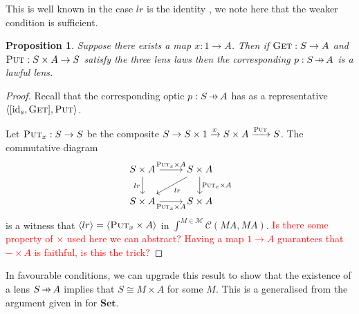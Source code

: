 \documentclass[11pt,a4paper]{article}
\theoremstyle{plain}
\newtheorem{proposition}[theorem]{Proposition}
\theoremstyle{definition}
\newcommand{\C}{\mathscr{C}}
\newcommand{\M}{\mathscr{M}}
\newcommand{\Set}{\mathbf{Set}}
\newcommand{\id}{\mathrm{id}}
\newcommand{\fget}{\textsc{Get}}
\newcommand{\fput}{\textsc{Put}}
\newcommand{\hto}{\ensuremath{\,\mathaccent\shortmid\rightarrow\,}}
\newcommand{\todo}[1]{\textcolor{red}{\small #1}}
\begin{document}
This is well known in the case $lr$ is the identity \cite{IsomorphismLensesPost}, we note here that the weaker condition is sufficient.

\begin{proposition}
Suppose there exists a map $x : 1 \to A$. Then if $\fget : S \to A$ and $\fput : S \times A \to S$ satisfy the three lens laws then the corresponding $p : S \hto A$ is a lawful lens.
\end{proposition}
\begin{proof}
Recall that the corresponding optic $p : S \hto A$ has as a representative $\langle [\id_s, \fget], \fput \rangle$.

Let $\fput_x : S \to S$ be the composite $S \to S \times 1 \xrightarrow{x} S \times A \xrightarrow{\fput} S$. The commutative diagram
\[
\begin{tikzcd}
S \times A \ar[r, "\fput_x \times A "] \ar[d, "lr", swap] & S \times A \ar[d, "\fput_x \times A"] \ar[dl, "lr"] \\
S \times A \ar[r, "\fput_x \times A", swap] & S \times A
\end{tikzcd}
\]
is a witness that $\langle lr \rangle = \langle \fput_x \times A \rangle$ in $\int^{M \in \M} \C(M A, M A)$.
\todo{Is there some property of $\times$ used here we can abstract? Having a map $1 \to A$ guarantees that $- \times A$ is faithful, is this the trick?}
\end{proof}

In favourable conditions, we can upgrade this result to show that the existence of a lens $S \hto A$ implies that $S \cong M \times A$ for some $M$. This is a generalised from the argument given in \cite[Corollary 13]{AlgebrasAndUpdateStrategies} for $\Set$.
\end{document}
